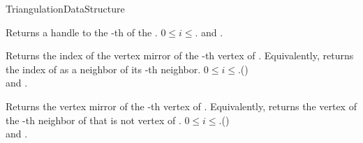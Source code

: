 \begin{ccRefConcept}{TriangulationDataStructure}



{ Returns a handle to the -th  of the  .
\ccPrecond $0\leq i\leq$\ccVar. and .}

{Returns the index of the vertex mirror of the -th vertex of .
Equivalently, returns the index of  as a neighbor of  its -th neighbor.
\ccPrecond $0\leq i\leq$\ccVar.()\\
and . }

{Returns the vertex mirror of the -th vertex of .
Equivalently, returns the vertex of the -th neighbor of 
that is not vertex of .
\ccPrecond $0\leq i\leq$\ccVar.()\\
and . }



\end{ccRefConcept}
